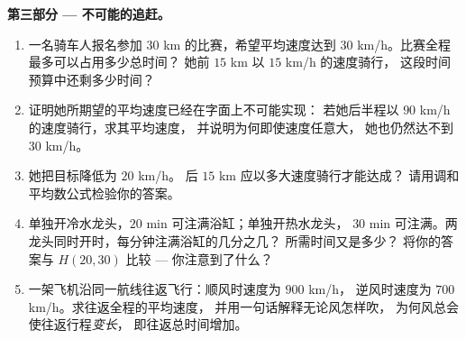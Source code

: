 \begin{problem}
\medskip
\noindent\textbf{第三部分 --- 不可能的追赶。}
\begin{enumerate}[resume]
  \item 一名骑车人报名参加 $30$ km 的比赛，希望平均速度达到
        $30$ km/h。比赛全程最多可以占用多少总时间？
        她前 $15$ km 以 $15$ km/h 的速度骑行，
        这段时间预算中还剩多少时间？
  \item 证明她所期望的平均速度已经在字面上不可能实现：
        若她后半程以 $90$ km/h 的速度骑行，求其平均速度，
        并说明为何即使速度任意大，
        她也仍然达不到
        $30$ km/h。
  \item 她把目标降低为 $20$ km/h。
        后 $15$ km 应以多大速度骑行才能达成？
        请用调和平均数公式检验你的答案。
  \item 单独开冷水龙头，$20$ min 可注满浴缸；单独开热水龙头，
        $30$ min 可注满。两龙头同时开时，每分钟注满浴缸的几分之几？
        所需时间又是多少？
        将你的答案与 $H(20, 30)$ 比较 ---
        你注意到了什么？
  \item 一架飞机沿同一航线往返飞行：顺风时速度为 $900$ km/h，
        逆风时速度为 $700$ km/h。求往返全程的平均速度，
        并用一句话解释无论风怎样吹，
        为何风总会使往返行程\emph{变长}，
        即往返总时间增加。
\end{enumerate}
\end{problem}
